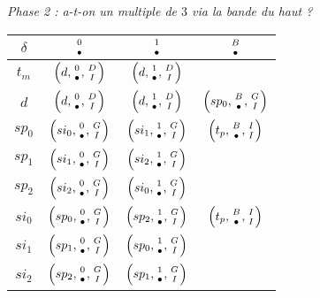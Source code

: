 \begin{center}
	\emph{\small Phase 2 : a-t-on un multiple de $3$ via la bande du haut ?}
	
	\smallskip
	\renewcommand{\arraystretch}{1.25}
	\begin{tabular}{|c||c|c|c||}
		\hline
		$\delta$ 
			& $\twocoord{0}{\bullet}$ 
			& $\twocoord{1}{\bullet}$ 
			& $\twocoord{B}{\bullet}$  \\
		\hline
		\hline
		$t_m$ 
			& $\left( d , \twocoord{0}{\bullet}, \twocoord{D}{I} \right)$ 
			& $\left( d , \twocoord{1}{\bullet}, \twocoord{D}{I} \right)$
			&  \\
		\hline
		$d$ 
			& $\left( d   , \twocoord{0}{\bullet}, \twocoord{D}{I} \right)$ 
			& $\left( d   , \twocoord{1}{\bullet}, \twocoord{D}{I} \right)$
			& $\left( sp_0, \twocoord{B}{\bullet}, \twocoord{G}{I} \right)$ \\
		\hline
		\hline
		$sp_0$ 
			& $\left( si_0 , \twocoord{0}{\bullet}, \twocoord{G}{I} \right)$ 
			& $\left( si_1 , \twocoord{1}{\bullet}, \twocoord{G}{I} \right)$
			& $\left( t_p  , \twocoord{B}{\bullet}, \twocoord{I}{I} \right)$ \\
		\hline
		$sp_1$ 
			& $\left( si_1 , \twocoord{0}{\bullet}, \twocoord{G}{I} \right)$ 
			& $\left( si_2 , \twocoord{1}{\bullet}, \twocoord{G}{I} \right)$
			&                 \\
		\hline
		$sp_2$ 
			& $\left( si_2 , \twocoord{0}{\bullet}, \twocoord{G}{I} \right)$ 
			& $\left( si_0 , \twocoord{1}{\bullet}, \twocoord{G}{I} \right)$
			&                 \\
		\hline
		\hline
		$si_0$ 
			& $\left( sp_0 , \twocoord{0}{\bullet}, \twocoord{G}{I} \right)$ 
			& $\left( sp_2 , \twocoord{1}{\bullet}, \twocoord{G}{I} \right)$
			& $\left( t_p  , \twocoord{B}{\bullet}, \twocoord{I}{I} \right)$ \\
		\hline
		$si_1$ 
			& $\left( sp_1 , \twocoord{0}{\bullet}, \twocoord{G}{I} \right)$ 
			& $\left( sp_0 , \twocoord{1}{\bullet}, \twocoord{G}{I} \right)$
			&                 \\
		\hline
		$si_2$ 
			& $\left( sp_2 , \twocoord{0}{\bullet}, \twocoord{G}{I} \right)$ 
			& $\left( sp_1 , \twocoord{1}{\bullet}, \twocoord{G}{I} \right)$
			&                 \\
		\hline
	\end{tabular}
	\renewcommand{\arraystretch}{1}
\end{center}




